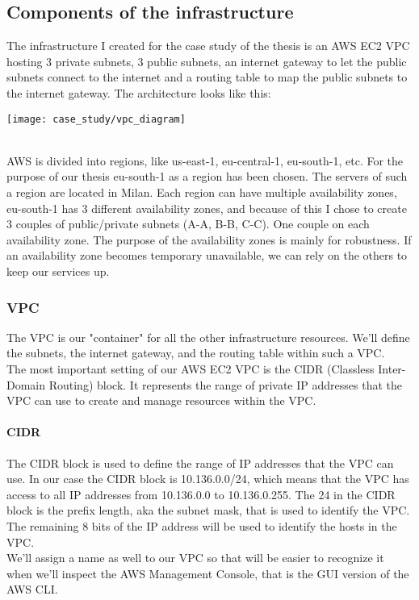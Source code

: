 \subsection{Components of the infrastructure}
The infrastructure I created for the case study of the thesis is an AWS EC2 \gls{VPC} hosting 3 private \gls{subnet}s, 3 public subnets, an \gls{internet gateway} to let the public subnets connect to the internet and a \gls{routing table} to map the public subnets to the internet gateway.
The architecture looks like this:
\begin{center}
  \texttt{[image: case\_study/vpc\_diagram]} 
\end{center}\mbox{}\\
AWS is divided into regions, like us-east-1, eu-central-1, eu-south-1, etc.
For the purpose of our thesis eu-south-1 as a region has been chosen.
The servers of such a region are located in Milan.
Each region can have multiple availability zones, eu-south-1 has 3 different availability zones, and because of this I chose to create 3 couples of public/private subnets (A-A, B-B, C-C).
One couple on each availability zone.
The purpose of the availability zones is mainly for robustness.
If an availability zone becomes temporary unavailable, we can rely on the others to keep our services up.


\subsubsection{VPC}
The VPC is our "container" for all the other infrastructure resources.
We'll define the subnets, the internet gateway, and the routing table within such a VPC.\\
The most important setting of our AWS EC2 VPC is the CIDR (Classless Inter-Domain Routing) block.
It represents the range of private IP addresses that the VPC can use to create and manage resources within the VPC.
\paragraph{CIDR}
The CIDR block is used to define the range of IP addresses that the VPC can use.
In our case the CIDR block is 10.136.0.0/24, which means that the VPC has access to all IP addresses from 10.136.0.0 to 10.136.0.255.
The 24 in the CIDR block is the prefix length, aka the subnet mask, that is used to identify the VPC.
The remaining 8 bits of the IP address will be used to identify the hosts in the VPC.\\
We'll assign a name as well to our VPC so that will be easier to recognize it when we'll inspect the AWS Management Console, that is the GUI version of the AWS CLI.

